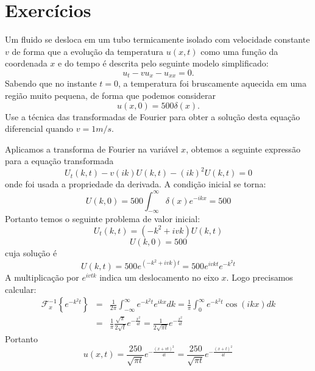 \section{Exercícios}
\begin{Exercise}
Um fluido se desloca em um tubo termicamente isolado com velocidade constante $v$ de forma que a evolução da temperatura $u(x,t)$ como uma função da coordenada $x$ e do tempo é descrita pelo seguinte modelo simplificado:
\begin{equation}u_t-vu_x-u_{xx}=0.\end{equation}
Sabendo que no instante $t=0$, a temperatura foi bruscamente aquecida em uma região muito pequena, de forma que podemos considerar
\begin{equation}u(x,0)=500 \delta(x).\end{equation} 
Use a técnica das transformadas de Fourier para obter a solução desta equação diferencial quando $v=1m/s$.
\end{Exercise}
\begin{Answer}
Aplicamos a transforma de Fourier na variável $x$, obtemos a seguinte expressão para a equação transformada
\begin{equation}U_t(k,t)-v(ik)U(k,t)-(ik)^2U(k,t)=0\end{equation}
onde foi usada a propriedade da derivada.
A condição inicial se torna:
\begin{equation}U(k,0)=500\int_{-\infty}^\infty \delta(x)e^{-ikx}=500\end{equation}
Portanto temos o seguinte problema de valor inicial:
\begin{equation}U_t(k,t)=(-k^2+ivk)U(k,t)\end{equation}
\begin{equation}U(k,0)=500\end{equation}
cuja solução é
\begin{equation}U(k,t)=500e^{(-k^2+ivk)t}=500 e^{ivkt}e^{-k^2t}\end{equation}
A multiplicação por $e^{ivtk}$ indica um deslocamento no eixo $x$. Logo precisamos calcular:
\begin{eqnarray*}
\mathcal{F}^{-1}_x\left\{e^{-k^2t}\right\}&=&\frac{1}{2\pi}\int_{-\infty}^\infty e^{-k^2t} e^{ikx}dk=\frac{1}{\pi}\int_{0}^\infty e^{-k^2t} \cos({ikx})dk\\
&=&\frac{1}{\pi}\frac{\sqrt{\pi}}{2\sqrt{t}}e^{-\frac{x^2}{4t}}=\frac{1}{2\sqrt{\pi t}}e^{-\frac{x^2}{4t}}
\end{eqnarray*}
Portanto
\begin{equation}u(x,t)=\frac{250}{\sqrt{\pi t}}e^{-\frac{(x+vt)^2}{4t}}=\frac{250}{\sqrt{\pi t}}e^{-\frac{(x+t)^2}{4t}}\end{equation}
\end{Answer}

